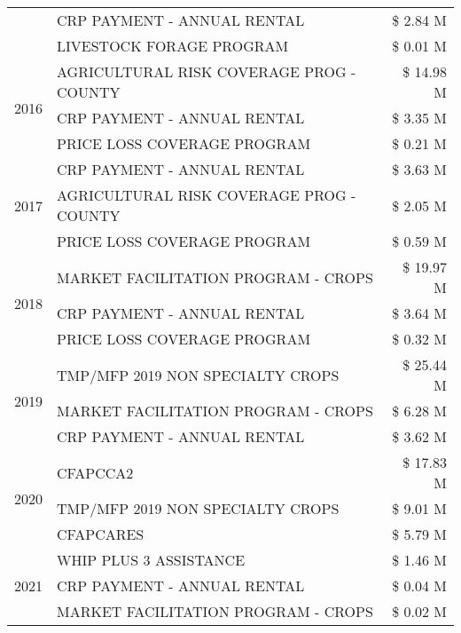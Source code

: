 \begin{tabular}{llr}
 & CRP PAYMENT - ANNUAL RENTAL & \$ 2.84 M \\
 & LIVESTOCK FORAGE PROGRAM & \$ 0.01 M \\
\cline{1-3}
\multirow[t]{3}{*}{2016} & AGRICULTURAL RISK COVERAGE PROG - COUNTY & \$ 14.98 M \\
 & CRP PAYMENT - ANNUAL RENTAL & \$ 3.35 M \\
 & PRICE LOSS COVERAGE PROGRAM & \$ 0.21 M \\
\cline{1-3}
\multirow[t]{3}{*}{2017} & CRP PAYMENT - ANNUAL RENTAL & \$ 3.63 M \\
 & AGRICULTURAL RISK COVERAGE PROG - COUNTY & \$ 2.05 M \\
 & PRICE LOSS COVERAGE PROGRAM & \$ 0.59 M \\
\cline{1-3}
\multirow[t]{3}{*}{2018} & MARKET FACILITATION PROGRAM - CROPS & \$ 19.97 M \\
 & CRP PAYMENT - ANNUAL RENTAL & \$ 3.64 M \\
 & PRICE LOSS COVERAGE PROGRAM & \$ 0.32 M \\
\cline{1-3}
\multirow[t]{3}{*}{2019} & TMP/MFP 2019 NON SPECIALTY CROPS & \$ 25.44 M \\
 & MARKET FACILITATION PROGRAM - CROPS & \$ 6.28 M \\
 & CRP PAYMENT - ANNUAL RENTAL & \$ 3.62 M \\
\cline{1-3}
\multirow[t]{3}{*}{2020} & CFAPCCA2 & \$ 17.83 M \\
 & TMP/MFP 2019 NON SPECIALTY CROPS & \$ 9.01 M \\
 & CFAPCARES & \$ 5.79 M \\
\cline{1-3}
\multirow[t]{3}{*}{2021} & WHIP PLUS 3 ASSISTANCE & \$ 1.46 M \\
 & CRP PAYMENT - ANNUAL RENTAL & \$ 0.04 M \\
 & MARKET FACILITATION PROGRAM - CROPS & \$ 0.02 M \\
\cline{1-3}
\bottomrule
\end{tabular}
